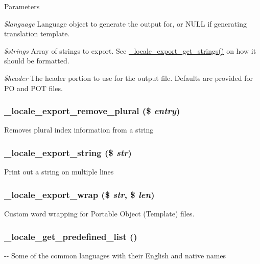 \begin{DoxyParams}{Parameters}
\item[{\em \$language}]Language object to generate the output for, or NULL if generating translation template. \item[{\em \$strings}]Array of strings to export. See \hyperlink{group__locale_gade17be27a5240ba4804dc51eccf40246}{\_\-locale\_\-export\_\-get\_\-strings()} on how it should be formatted. \item[{\em \$header}]The header portion to use for the output file. Defaults are provided for PO and POT files. \end{DoxyParams}
\hypertarget{group__locale_gaa18a14faeb8268aee1530afb6b03cca1}{
\subsubsection[{\_\-locale\_\-export\_\-remove\_\-plural}]{\setlength{\rightskip}{0pt plus 5cm}\_\-locale\_\-export\_\-remove\_\-plural (\$ {\em entry})}}
\label{group__locale_gaa18a14faeb8268aee1530afb6b03cca1}
Removes plural index information from a string \hypertarget{group__locale_ga8203c2c5a4f964da2395889920934fae}{
\subsubsection[{\_\-locale\_\-export\_\-string}]{\setlength{\rightskip}{0pt plus 5cm}\_\-locale\_\-export\_\-string (\$ {\em str})}}
\label{group__locale_ga8203c2c5a4f964da2395889920934fae}
Print out a string on multiple lines \hypertarget{group__locale_gaae41274b64222185a36a42dbc0ff4b94}{
\subsubsection[{\_\-locale\_\-export\_\-wrap}]{\setlength{\rightskip}{0pt plus 5cm}\_\-locale\_\-export\_\-wrap (\$ {\em str}, \/  \$ {\em len})}}
\label{group__locale_gaae41274b64222185a36a42dbc0ff4b94}
Custom word wrapping for Portable Object (Template) files. \hypertarget{group__locale_gafac9d59fd436286a3f3738140ce96e82}{
\subsubsection[{\_\-locale\_\-get\_\-predefined\_\-list}]{\setlength{\rightskip}{0pt plus 5cm}\_\-locale\_\-get\_\-predefined\_\-list ()}}
\label{group__locale_gafac9d59fd436286a3f3738140ce96e82}
-\/-\/ Some of the common languages with their English and native names

